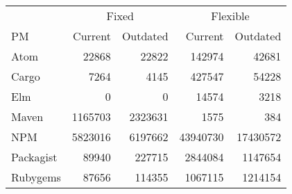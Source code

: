 \begin{tabular}{|l|rr|rr|}
\hline
& \multicolumn{2}{c|}{Fixed} & \multicolumn{2}{c|}{Flexible} \\
PM & Current & Outdated & Current & Outdated \\
\hline
Atom & 22868 & 22822 & 142974 & 42681 \\
Cargo & 7264 & 4145 & 427547 & 54228 \\
Elm & 0 & 0 & 14574 & 3218 \\
Maven & 1165703 & 2323631 & 1575 & 384 \\
NPM & 5823016 & 6197662 & 43940730 & 17430572 \\
Packagist & 89940 & 227715 & 2844084 & 1147654 \\
Rubygems & 87656 & 114355 & 1067115 & 1214154 \\
\hline
\end{tabular}
